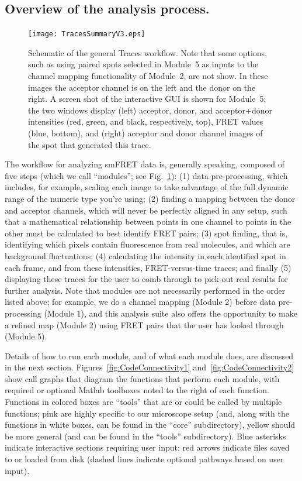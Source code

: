 \documentclass[11pt]{article}
\begin{document}
\subsection{Overview of the analysis process.}

\begin{figure}
\begin{center}
\texttt{[image: TracesSummaryV3.eps]}
\caption{Schematic of the general Traces workflow. Note that some options, such as using paired spots selected in Module~5 as inputs to the channel mapping functionality of Module~2, are not show. In these images the acceptor channel is on the left and the donor on the right. A screen shot of the interactive GUI is shown for Module~5; the two windows display (left) acceptor, donor, and acceptor+donor intensities (red, green, and black, respectively, top), FRET values (blue, bottom), and (right) acceptor and donor channel images of the spot that generated this trace.}
\label{fig:Workflow}
\end{center}
\end{figure}

The workflow for analyzing smFRET data is, generally speaking, composed of five steps (which we call ``modules''; see Fig.~\ref{fig:Workflow}): (1) data pre-processing, which includes, for example, scaling each image to take advantage of the full dynamic range of the numeric type you're using; (2) finding a mapping between the donor and acceptor channels, which will never be perfectly aligned in any setup, such that a mathematical relationship between points in one channel to points in the other must be calculated to best identify FRET pairs; (3) spot finding, that is, identifying which pixels contain fluorescence from real molecules, and which are background fluctuations; (4) calculating the intensity in each identified spot in each frame, and from these intensities, FRET-versus-time traces; and finally (5) displaying these traces for the user to comb through to pick out real results for further analysis.  Note that modules are not necessarily performed in the order listed above; for example, we do a channel mapping (Module 2) before data pre-processing (Module 1), and this analysis suite also offers the opportunity to make a refined map (Module 2) using FRET pairs that the user has looked through (Module 5).

Details of how to run each module, and of what each module does, are discussed in the next section.  Figures~\ref{fig:CodeConnectivity1} and~\ref{fig:CodeConnectivity2} show call graphs that diagram the functions that perform each module, with required or optional Matlab toolboxes noted to the right of each function. Functions in colored boxes are ``tools'' that are or could be called by multiple functions; pink are highly specific to our microscope setup (and, along with the functions in white boxes, can be found in the ``core'' subdirectory), yellow should be more general (and can be found in the ``tools'' subdirectory).  Blue asterisks indicate interactive sections requiring user input; red arrows indicate files saved to or loaded from disk (dashed lines indicate optional pathways based on user input).
\end{document}
